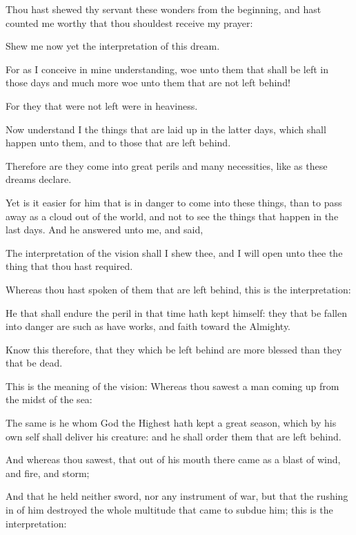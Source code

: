 {\par }{\PP {}Thou hast shewed thy servant these wonders from the beginning, and hast counted me worthy that thou shouldest receive my prayer:
\par }{\PP {}Shew me now yet the interpretation of this dream.
\par }{\PP {}For as I conceive in mine understanding, woe unto them that shall be left in those days and much more woe unto them that are not left behind!
\par }{\PP {}For they that were not left were in heaviness.
\par }{\PP {}Now understand I the things that are laid up in the latter days, which shall happen unto them, and to those that are left behind.
\par }{\PP {}Therefore are they come into great perils and many necessities, like as these dreams declare.
\par }{\PP {}Yet is it easier for him that is in danger to come into these things, than to pass away as a cloud out of the world, and not to see the things that happen in the last days. And he answered unto me, and said,
\par }{\PP {}The interpretation of the vision shall I shew thee, and I will open unto thee the thing that thou hast required.
\par }{\PP {}Whereas thou hast spoken of them that are left behind, this is the interpretation:
\par }{\PP {}He that shall endure the peril in that time hath kept himself: they that be fallen into danger are such as have works, and faith toward the Almighty.
\par }{\PP {}Know this therefore, that they which be left behind are more blessed than they that be dead.
\par }{\PP {}This is the meaning of the vision: Whereas thou sawest a man coming up from the midst of the sea:
\par }{\PP {}The same is he whom God the Highest hath kept a great season, which by his own self shall deliver his creature: and he shall order them that are left behind.
\par }{\PP {}And whereas thou sawest, that out of his mouth there came as a blast of wind, and fire, and storm;
\par }{\PP {}And that he held neither sword, nor any instrument of war, but that the rushing in of him destroyed the whole multitude that came to subdue him; this is the interpretation:
}
